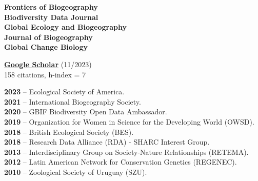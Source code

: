 \documentclass[9pt]{developercv} %
\begin{document}

\begin{minipage}[t]{0.35\textwidth}
	\vspace{-\baselineskip} %
	
	\textbf{Frontiers of Biogeography}\\
	\textbf{Biodiversity Data Journal}\\
	\textbf{Global Ecology and Biogeography}\\
	\textbf{Journal of Biogeography}\\
	\textbf{Global Change Biology}


	\textbf{\href{https://scholar.google.com/citations?user=9KCM81IAAAAJ&hl}{Google Scholar}} (11/2023)\\
	158 citations, h-index = 7\\
\end{minipage} 
\hfill
\begin{minipage}[t]{0.65\textwidth}
	\vspace{-\baselineskip} %


	\textbf{2023} -- Ecological Society of America.\\
	\textbf{2021} -- International Biogeography Society.\\
	\textbf{2020} -- GBIF Biodiversity Open Data Ambassador.\\
	\textbf{2019} -- Organization for Women in Science for the Developing World (OWSD).\\
	\textbf{2018} -- British Ecological Society (BES).\\ 
	\textbf{2018} -- Research Data Alliance (RDA) - SHARC Interest Group.\\ 
	\textbf{2013} -- Interdisciplinary Group on Society-Nature Relationships (RETEMA).\\
	\textbf{2012} -- Latin American Network for Conservation Genetics (REGENEC).\\
	\textbf{2010} -- Zoological Society of Uruguay (SZU).\\\\
	
\end{minipage} 
\end{document}
